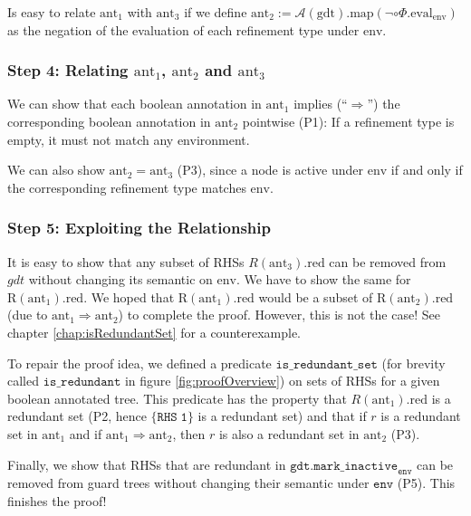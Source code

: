 Is easy to relate $\mathrm{ant_1}$ with $\mathrm{ant_3}$ if we define $\mathrm{ant_2} := \mathcal{A}(\mathrm{gdt}).\mathrm{map}(\neg \circ \Phi.\mathrm{eval}_{\mathrm{env}})$ as the negation of the evaluation of each refinement type under $\mathrm{env}$.

\subsubsection{Step 4: Relating $\mathrm{ant}_1$, $\mathrm{ant}_2$ and $\mathrm{ant}_3$}

We can show that each boolean annotation in $\mathrm{ant_1}$ implies (``$\Rightarrow$'') the corresponding boolean annotation in $\mathrm{ant_2}$ pointwise (P1):
If a refinement type is empty, it must not match any environment.

We can also show $\mathrm{ant}_2 = \mathrm{ant}_3$ (P3), since a node is active under $\mathrm{env}$ if and only if the corresponding refinement type matches $\mathrm{env}$.

\subsubsection{Step 5: Exploiting the Relationship}

It is easy to show that any subset of RHSs $R(\mathrm{ant_3}).\mathrm{red}$ can be removed from $gdt$ without changing its semantic on $\mathrm{env}$.
We have to show the same for $\mathrm{R}(\mathrm{ant_1}).\mathrm{red}$.
We hoped that $\mathrm{R}(\mathrm{ant_1}).\mathrm{red}$ would be a subset of $\mathrm{R}(\mathrm{ant_2}).\mathrm{red}$ (due to $\mathrm{ant_1} \Rightarrow \mathrm{ant_2}$) to complete the proof. However, this is not the case! See chapter \ref{chap:isRedundantSet} for a counterexample.

To repair the proof idea, we defined a predicate $\mathtt{is\_redundant\_set}$ (for brevity called $\mathtt{is\_redundant}$ in figure \ref{fig:proofOverview}) on sets of RHSs for a given boolean annotated tree.
This predicate has the property that $R(\mathrm{ant_1}).\mathrm{red}$ is a redundant set (P2, hence $\{ \mathtt{RHS\;1} \}$ is a redundant set) and that if $r$ is a redundant set in $\mathrm{ant_1}$ and if $\mathrm{ant_1} \Rightarrow \mathrm{ant_2}$,
then $r$ is also a redundant set in $\mathrm{ant_2}$ (P3).

Finally, we show that RHSs that are redundant in $\mathtt{gdt.mark\_inactive}_\mathtt{env}$ can be removed from guard trees without changing their semantic under $\mathtt{env}$ (P5).
This finishes the proof!

